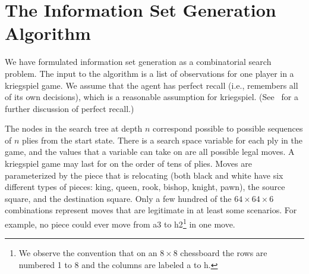 \documentclass[conference]{IEEEtran}
\begin{document}

   
\section{The Information Set Generation Algorithm}
We have formulated information set generation as a combinatorial search problem.  The input to the algorithm is a list
of observations for one player in a kriegspiel game.  We assume that the agent has perfect recall (i.e., remembers all
of its own decisions), which is a reasonable assumption for kriegspiel.  (See~\cite{gilpin07algorithms} for a further
discussion of perfect recall.)  

The nodes in the search tree at depth $n$ correspond possible to possible sequences of $n$ plies from the start state.
There is a search space variable for each ply in the game, and the values that a variable can take on are all possible
legal moves.  A kriegspiel game may last for on the order of tens of plies.  Moves are parameterized by the piece that
is relocating (both black and white have six different types of pieces: king, queen, rook, bishop, knight, pawn), the
source square, and the destination square.  Only a few hundred of the $64 \times 64 \times 6$ combinations represent
moves that are legitimate in at least some scenarios.  For example, no piece could ever move from a3 to h2\footnote{We
observe the convention that on an $8 \times 8$ chessboard the rows are numbered 1 to 8 and the columns are labeled a to
h.} in one move.
\end{document}
